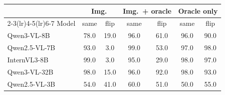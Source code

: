 \begin{tabular}{lcccccc}
\toprule
 & \multicolumn{2}{c}{Img.} & \multicolumn{2}{c}{Img.\ + oracle} & \multicolumn{2}{c}{Oracle only} \\
\cmidrule(lr){2-3}\cmidrule(lr){4-5}\cmidrule(lr){6-7}
Model & same & flip & same & flip & same & flip \\
\midrule
Qwen3-VL-8B & 78.0 & 19.0 & 96.0 & 61.0 & 96.0 & 90.0 \\
Qwen2.5-VL-7B & 93.0 & 3.0 & 99.0 & 53.0 & 97.0 & 98.0 \\
InternVL3-8B & 99.0 & 3.0 & 95.0 & 29.0 & 98.0 & 97.0 \\
Qwen3-VL-32B & 98.0 & 15.0 & 96.0 & 92.0 & 98.0 & 93.0 \\
Qwen2.5-VL-3B & 54.0 & 41.0 & 60.0 & 51.0 & 50.0 & 55.0 \\
\bottomrule
\end{tabular}
